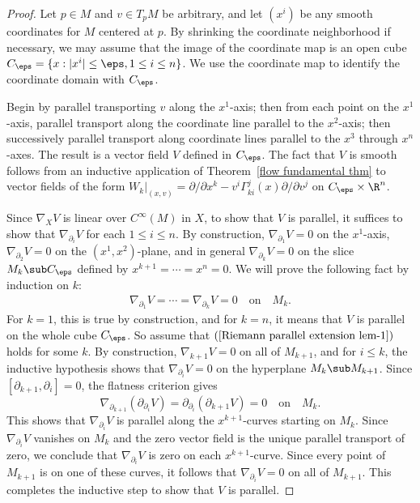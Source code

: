 \begin{proof}
Let $p\in M$ and $v\in T_pM$ be arbitrary, and let $(x^i)$ be any smooth coordinates for $M$ centered at $p$. By shrinking the coordinate neighborhood if necessary, we 
may assume that the image of the coordinate map is an open cube $C_\eps=\{x:|x^i|\leq\eps,1\leq i\leq n\}$. We use the coordinate map to identify the coordinate domain 
with $C_\eps$.\par
Begin by parallel transporting $v$ along the $x^1$-axis; then from each point on the $x^1$-axis, parallel transport along the coordinate line parallel to the $x^2$-axis; 
then successively parallel transport along coordinate lines parallel to the $x^3$ through $x^n$-axes. The result is a vector field $V$ defined in $C_\eps$. 
The fact that $V$ is smooth follows from an inductive application of Theorem~\ref{flow fundamental thm} to vector fields of the form 
$W_k|_{(x,v)}=\partial/\partial x^k-v^i\Gamma_{ki}^j(x)\partial/\partial v^j$ on $C_\eps\times\R^n$.\par
Since $\nabla_XV$ is linear over $C^\infty(M)$ in $X$, to show that $V$ is parallel, it suffices to show that $\nabla_{\partial_i}V$ for each $1\leq i\leq n$. By 
construction, $\nabla_{\partial_1}V=0$ on the $x^1$-axis, $\nabla_{\partial_2}V=0$ on the $(x^1,x^2)$-plane, and in general $\nabla_{\partial_k}V=0$ on the slice $M_k\sub C_\eps$ 
defined by $x^{k+1}=\cdots=x^n=0$. We will prove the following fact by induction on $k$:
\begin{align}\label{Riemann parallel extension lem-1}
\nabla_{\partial_1}V=\cdots=\nabla_{\partial_k}V=0\quad\text{on}\quad M_k.
\end{align}
For $k=1$, this is true by construction, and for $k=n$, it means that $V$ is parallel on the whole cube $C_\eps$. So assume that $(\ref{Riemann parallel extension lem-1})$ 
holds for some $k$. By construction, $\nabla_{k+1}V=0$ on all of $M_{k+1}$, and for $i\leq k$, the inductive hypothesis shows that $\nabla_{\partial_i}V=0$ on the 
hyperplane $M_k\sub M_{k+1}$. Since $[\partial_{k+1},\partial_i]=0$, the flatness criterion gives
\[\nabla_{\partial_{k+1}}(\partial_{\partial_i}V)=\partial_{\partial_i}(\partial_{k+1}V)=0\quad\text{on}\quad M_k.\]
This shows that $\nabla_{\partial_i}V$ is parallel along the $x^{k+1}$-curves starting on $M_k$. Since $\nabla_{\partial_i}V$ vanishes on $M_k$ and the zero vector field is the unique parallel transport of zero, we conclude that $\nabla_{\partial_i}V$ is zero on each $x^{k+1}$-curve. Since every point of $M_{k+1}$ is on one of these curves, it follows that $\nabla_{\partial_i}V=0$ on all of $M_{k+1}$. This completes the inductive step to show that $V$ is parallel.
\end{proof}

